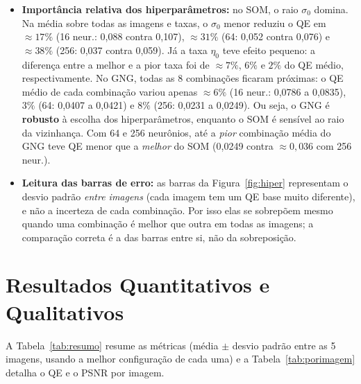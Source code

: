 \documentclass[11pt,a4paper]{article}
\begin{document}
\begin{itemize}
    \item \textbf{Importância relativa dos hiperparâmetros:} no SOM, o raio $\sigma_0$ domina. Na média sobre todas as imagens e taxas, o $\sigma_0$ menor reduziu o QE em $\approx17\%$ (16 neur.: 0,088 contra 0,107), $\approx31\%$ (64: 0,052 contra 0,076) e $\approx38\%$ (256: 0,037 contra 0,059). Já a taxa $\eta_0$ teve efeito pequeno: a diferença entre a melhor e a pior taxa foi de $\approx7\%$, $6\%$ e $2\%$ do QE médio, respectivamente. No GNG, todas as 8 combinações ficaram próximas: o QE médio de cada combinação variou apenas $\approx6\%$ (16 neur.: 0,0786 a 0,0835), $3\%$ (64: 0,0407 a 0,0421) e $8\%$ (256: 0,0231 a 0,0249). Ou seja, o GNG é \textbf{robusto} à escolha dos hiperparâmetros, enquanto o SOM é sensível ao raio da vizinhança. Com 64 e 256 neurônios, até a \emph{pior} combinação média do GNG teve QE menor que a \emph{melhor} do SOM (0,0249 contra $\approx0{,}036$ com 256 neur.).
    \item \textbf{Leitura das barras de erro:} as barras da Figura~\ref{fig:hiper} representam o desvio padrão \emph{entre imagens} (cada imagem tem um QE base muito diferente), e não a incerteza de cada combinação. Por isso elas se sobrepõem mesmo quando uma combinação é melhor que outra em todas as imagens; a comparação correta é a das barras entre si, não da sobreposição.
\end{itemize}

\section{Resultados Quantitativos e Qualitativos}

A Tabela~\ref{tab:resumo} resume as métricas (média $\pm$ desvio padrão entre as 5 imagens, usando a melhor configuração de cada uma) e a Tabela~\ref{tab:porimagem} detalha o QE e o PSNR por imagem.
\end{document}

